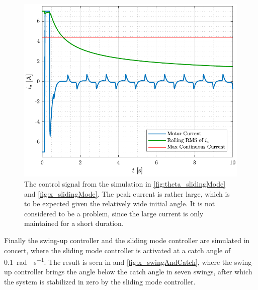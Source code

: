 %
\begin{figure}[H]
  \includegraphics[width=.42\textwidth]{figures/ia_slidingMode}
  \caption{The control signal from the simulation in \autoref{fig:theta_slidingMode} and \ref{fig:x_slidingMode}. The peak current is rather large, which is to be expected given the relatively wide initial angle. It is not considered to be a problem, since the large current is only maintained for a short duration.}
  \label{fig:ia_slidingMode}
\end{figure}
%
Finally the swing-up controller and the sliding mode controller are simulated in concert, where the sliding mode controller is activated at a catch angle of \SI{0.1}{rad \cdot s^{-1}}. The result is seen in  and \autoref{fig:x_swingAndCatch}, where the swing-up controller brings the angle below the catch angle in seven swings, after which the system is stabilized in zero by the sliding mode controller.
%

